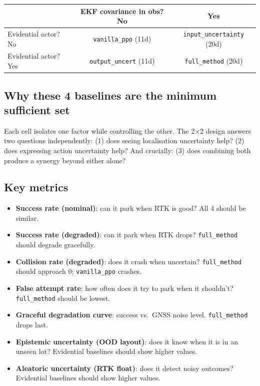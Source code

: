 \documentclass[11pt,a4paper]{article}
\begin{document}
\begin{center}
\begin{tabular}{l|cc}
 & EKF covariance in obs? No & Yes \\
\hline
Evidential actor? No  & \texttt{vanilla\_ppo} (11d) & \texttt{input\_uncertainty} (20d) \\
Evidential actor? Yes & \texttt{output\_uncert} (11d) & \texttt{full\_method} (20d) \\
\end{tabular}
\end{center}

\subsection{Why these 4 baselines are the minimum sufficient set}

Each cell isolates one factor while controlling the other. The 2$\times$2
design answers two questions independently: (1) does seeing localisation
uncertainty help? (2) does expressing action uncertainty help? And crucially:
(3) does combining both produce a synergy beyond either alone?

\subsection{Key metrics}

\begin{itemize}
  \item \textbf{Success rate (nominal)}: can it park when RTK is good?
        All 4 should be similar.
  \item \textbf{Success rate (degraded)}: can it park when RTK drops?
        \texttt{full\_method} should degrade gracefully.
  \item \textbf{Collision rate (degraded)}: does it crash when uncertain?
        \texttt{full\_method} should approach 0; \texttt{vanilla\_ppo} crashes.
  \item \textbf{False attempt rate}: how often does it try to park when
        it shouldn't? \texttt{full\_method} should be lowest.
  \item \textbf{Graceful degradation curve}: success vs.\ GNSS noise level.
        \texttt{full\_method} drops last.
  \item \textbf{Epistemic uncertainty (OOD layout)}: does it know when it
        is in an unseen lot? Evidential baselines should show higher values.
  \item \textbf{Aleatoric uncertainty (RTK float)}: does it detect noisy
        outcomes? Evidential baselines should show higher values.
\end{itemize}
\end{document}
